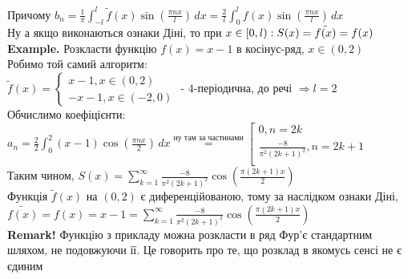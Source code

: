 \documentclass[a4paper, 14pt]{extarticle}
\def\hugespace{\vspace{5mm} \\}
\begin{document}
Причому $b_n = \displaystyle \frac{1}{\pi} \int_{-l}^{l} \tilde{f}(x) \sin \left( \frac{\pi n x}{l} \right) \,dx = \frac{2}{l} \int_0^l f(x) \sin \left( \frac{\pi n x}{l} \right)\,dx$\\
Ну а якщо виконаються ознаки Діні, то при $x \in [0,l): \\ S(x) = \tilde{f(x)} = f(x)$
\hugespace
\textbf{Example. } Розкласти функцію $f(x) = x-1$ в косінус-ряд, $x \in (0,2)$\\
Робимо той самий алгоритм:\\
$\tilde{f}(x) = \begin{cases} x-1, x \in (0,2) \\ -x-1, x \in (-2,0) \end{cases}$ - $4$-періодична, до речі $\Rightarrow l =2$ \\
Обчислимо коефіцієнти:\\
$\displaystyle a_n = \frac{2}{2} \int_0^2 (x-1)\cos \left(\frac{\pi n x}{2} \right)\,dx \overset{\textrm{ну там за частинами}}{=} \left[ 
      \begin{gathered} 
        0, n = 2k \\ 
        \frac{-8}{\pi^2(2k+1)^2} , n = 2k+1 \\ 
      \end{gathered} 
\right.$\\
Таким чином, $S(x) = \displaystyle \sum_{k=1}^{\infty} \frac{-8}{\pi^2(2k+1)^2} \cos \left(\frac{\pi (2k+1) x}{2} \right)$\\
Функція $\tilde{f}(x)$ на $(0,2)$ є диференційованою, тому за наслідком ознаки Діні,\\
$\tilde{f(x)} = f(x) = x-1 = \displaystyle \sum_{k=1}^{\infty} \frac{-8}{\pi^2(2k+1)^2} \cos \left(\frac{\pi (2k+1) x}{2} \right)$\\
\textbf{Remark!} Функцію з прикладу можна розкласти в ряд Фур'є стандартним шляхом, не подовжуючи її. Це говорить про те, що розклад в якомусь сенсі не є єдиним
\hugespace
\end{document}

